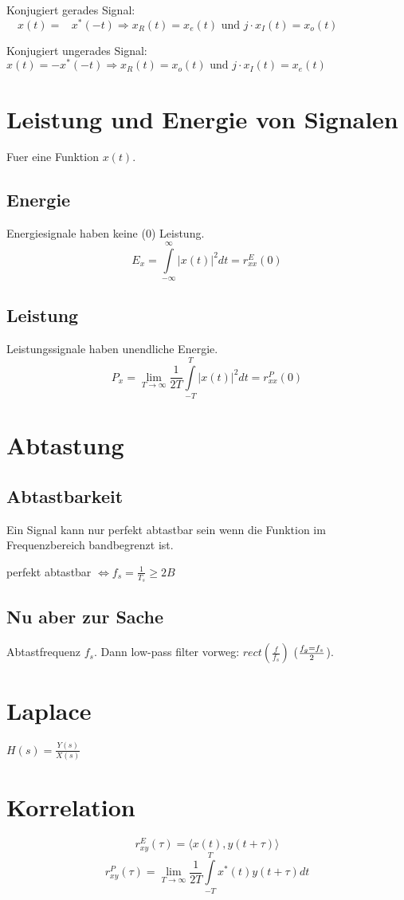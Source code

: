 \documentclass[10pt,a4paper]{article}
\begin{document}
Konjugiert gerades Signal: $\,\,\,\,\,\, x(t) = \,\,\,\,\,x^*(-t) \Rightarrow x_R(t) = x_e(t) \mbox{ und } j\cdot x_I(t) = x_o(t)$

Konjugiert ungerades Signal: $x(t) = -x^*(-t) \Rightarrow x_R(t) = x_o(t) \mbox{ und } j\cdot x_I(t) = x_e(t)$

\section{Leistung und Energie von Signalen}
Fuer eine Funktion $x(t)$.
\subsection{Energie}
Energiesignale haben keine ($0$) Leistung.
\[
E_x = \int\limits_{-\infty}^\infty \left| x(t) \right|^2 dt = r_{xx}^E (0)
\]
\subsection{Leistung}
Leistungssignale haben unendliche Energie.
\[
P_x = \lim\limits_{T \rightarrow \infty} \frac{1}{2T} \int\limits_{-T}^T \left| x(t) \right|^2 dt = r_{xx}^P(0)
\]

\section{Abtastung}
\subsection{Abtastbarkeit}
Ein Signal kann nur perfekt abtastbar sein wenn die Funktion im Frequenzbereich bandbegrenzt ist.

perfekt abtastbar $\Leftrightarrow f_s = \frac{1}{T_s} \geq 2B$

\subsection{Nu aber zur Sache}
Abtastfrequenz $f_s$. Dann low-pass filter vorweg: $rect\left(\frac{f}{f_s}\right)$ ($f_g = f_s \over 2$).

\section{Laplace}
$H(s) = \frac{Y(s)}{X(s)}$

\section{Korrelation}
\[
r_{xy}^E(\tau) = \langle x(t), y(t+\tau) \rangle
\]
\[
r_{xy}^P(\tau) = \lim\limits_{T \rightarrow \infty} \frac{1}{2T} \int\limits_{-T}^T x^*(t)y(t+\tau) dt
\]
\end{document}
